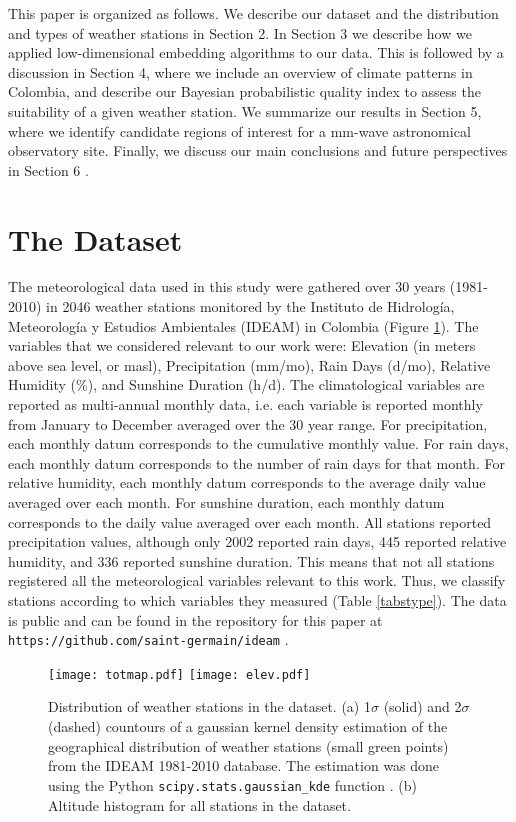 \documentclass[12pt]{iopart}
\begin{document}
This paper is organized as follows. We describe our dataset and the distribution and types of weather stations in Section 2. In Section 3 we describe how we applied low-dimensional embedding algorithms to our data. This is followed by a discussion in Section 4, where we include an overview of climate patterns in Colombia, and describe our Bayesian probabilistic quality index to assess the suitability of a given weather station. We summarize our results in Section 5, where we identify candidate regions of interest for a mm-wave astronomical observatory site. Finally, we discuss our main conclusions and future perspectives in Section 6 .
  
  
\section{The Dataset}

The meteorological data used in this study were gathered over 30 years (1981-2010) in 2046 weather stations monitored by the Instituto de Hidrolog\'ia, Meteorolog\'ia y Estudios Ambientales (IDEAM) in Colombia (Figure \ref{totmap}). The  variables that we considered relevant to our work were: Elevation (in meters above sea level, or masl), Precipitation (mm/mo), Rain Days (d/mo),  Relative Humidity (\%), and Sunshine Duration (h/d). The climatological variables are reported as multi-annual monthly data, i.e. each variable is reported monthly from January to December averaged over the 30 year range. For precipitation, each monthly datum corresponds to the cumulative monthly value.  For rain days, each monthly datum corresponds to the number of rain days for that month.  For relative humidity, each monthly datum corresponds to the  average daily value averaged over each month. For sunshine duration, each monthly datum corresponds to the daily value averaged over each month. All stations reported precipitation values, although only 2002 reported rain days, 445 reported relative humidity, and 336 reported sunshine duration. This means that not all stations registered all the meteorological variables relevant to this work. Thus, we classify stations according to which variables they measured (Table \ref{tabstype}). The data is public and can be found in the repository for this paper at \texttt{https://github.com/saint-germain/ideam} .\\

\begin{figure}
\begin{center}
\texttt{[image: totmap.pdf]}
\texttt{[image: elev.pdf]}
\caption{Distribution of weather stations in the dataset. (a) 1$\sigma$ (solid) and 2$\sigma$ (dashed) countours of a gaussian kernel density estimation of the geographical distribution of weather stations (small green points) from the IDEAM 1981-2010 database. The estimation was done using the Python \texttt{scipy.stats.gaussian\_kde}  function \cite{scipy}. (b) Altitude histogram for all stations in the dataset.}\label{totmap}
\end{center}
\end{figure}
\end{document}
